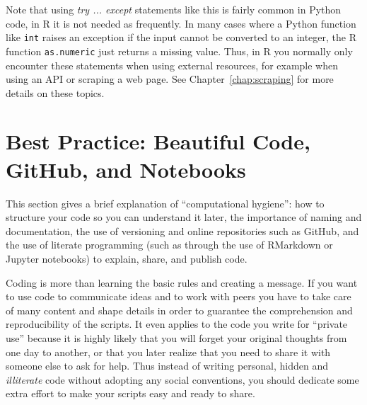 Note that using \emph{try ... except} statements like this is fairly common in Python code,
in R it is not needed as frequently.
In many cases where a Python function like \verb|int| raises an exception
if the input cannot be converted to an integer, the R function \verb|as.numeric| just returns a missing value.
Thus, in R you normally only encounter these statements when using external resources,
for example when using an API or scraping a web page. See Chapter~\ref{chap:scraping} for more details on these topics.



%

\section{Best Practice: Beautiful Code, GitHub, and Notebooks}
\label{sec:practices}


This section gives a brief explanation of ``computational hygiene'': how to structure your code so you can understand it later, the importance of naming and documentation, the use of versioning and online repositories such as GitHub, and the use of literate programming (such as through the use of RMarkdown or Jupyter notebooks) to explain, share, and publish code.

Coding is more than learning the basic rules and creating a message. If you want to use code to communicate ideas and to work with peers you have to take care of many content and shape details in order to guarantee the comprehension and reproducibility of the scripts. It even applies to the code you write for ``private use'' because it is highly likely that you will  forget your original thoughts from one day to another, or that you later realize that you need to share it with someone else to ask for help. Thus instead of writing personal, hidden and \textit{illiterate} code without adopting any social conventions, you should dedicate some extra effort to make your scripts easy and ready to share.

